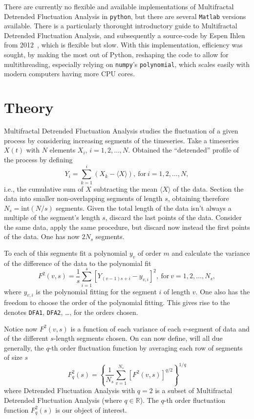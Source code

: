 \documentclass[pre, a4paper, aps, floatfix, superscriptaddress, onecolumn, notitlepage, longbibliography]{revtex4-1} %
\begin{document}
There are currently no flexible and available implementations of Multifractal Detrended Fluctuation Analysis in \texttt{python}, but there are several \texttt{Matlab} versions available.
There is a particularly thorought introductory guide to Multifractal Detrended Fluctuation Analysis, and subsequently a source-code by Espen Ihlen from 2012~\cite{Ihlen2012}, which is flexible but slow.
With this implementation, efficiency was sought, by making the most out of Python, reshaping the code to allow for multithreading, especially relying on \texttt{numpy}'s \texttt{polynomial}, which scales easily with modern computers having more CPU cores.

\section*{Theory}
Multifractal Detrended Fluctuation Analysis studies the fluctuation of a given process by considering increasing segments of the timeseries.
Take a timeseries $X(t)$ with $N$ elements $X_i$, $i=1,2, \dots, N$.
Obtained the ``detrended'' profile of the process by defining
\begin{equation}
  Y_i = \sum_{k=1}^i \left ( X_k - \langle X \rangle \right),~\text{for}~i=1,2, \dots, N,\nonumber
\end{equation}
i.e., the cumulative sum of $X$ subtracting the mean $\langle X \rangle$ of the data.
Section the data into smaller non-overlapping segments of length $s$, obtaining therefore $N_s = \text{int}(N/s)$ segments.
Given the total length of the data isn't always a multiple of the segment's length $s$, discard the last points of the data.
Consider the same data, apply the same procedure, but discard now instead the first points of the data.
One has now $2N_s$ segments.

To each of this segments fit a polynomial $y_v$ of order $m$ and calculate the variance of the difference of the data to the polynomial fit
\begin{equation}
  F^2(v,s) = \frac{1}{s} \sum_{i=1}^s [Y_{(v-1)s + i} - y_{v,i}]^2, ~\text{for}~v=1,2, \dots, N_s,\nonumber
\end{equation}
where $y_{v,i}$ is the polynomial fitting for the segment $i$ of length $v$.
One also has the freedom to choose the order of the polynomial fitting.
This gives rise to the denotes \texttt{DFA1}, \texttt{DFA2}, \dots, for the orders chosen.

Notice now $F^2(v,s)$ is a function of each variance of each $v$-segment of data and of the different $s$-length segments chosen.
On can now define, will all due generally, the $q$-th order fluctuation function by averaging each row of segments of size $s$
\begin{equation}
  F_q^2(s) = \left\{\frac{1}{N_s} \sum_{v=1}^{N_s} [F^2(v,s)]^{q/2}\right\}^{1/q}\nonumber \tag{1}
\end{equation}
where Detrended Fluctuation Analysis with $q=2$ is a subset of Multifractal Detrended Fluctuation Analysis (where $q\in \mathbb{R}$).
The $q$-th order fluctuation function $F_q^2(s)$ is our object of interest.
\end{document}
